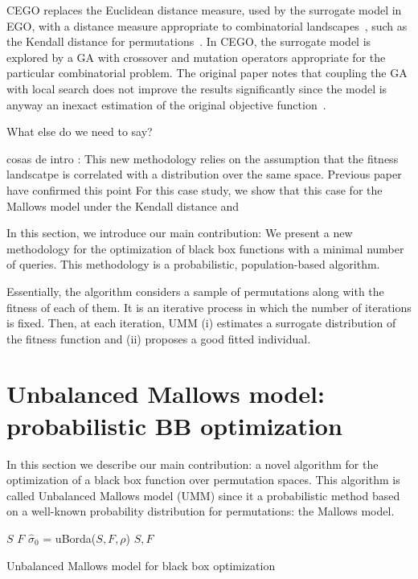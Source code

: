 \documentclass[runningheads]{llncs}
\begin{document}
CEGO replaces the Euclidean distance measure, used by the surrogate model in
EGO, with a distance measure appropriate to combinatorial
landscapes~\citep{ZaeStoBar2014:ppsn}, such as the Kendall distance for
permutations~\citep{?}. In CEGO, the surrogate model is explored by a GA with
crossover and mutation operators appropriate for the particular combinatorial
problem. The original paper notes that coupling the GA with local search does
not improve the results significantly since the model is anyway an inexact
estimation of the original objective
function~\citep[p.~875]{ZaeStoFriFisNauBar2014}.

What else do we need to say?

\newcommand{\minit}{\ensuremath{m_\text{ini}}\xspace}

\newcommand{\FEmax}{\ensuremath{\textit{FE}_{\max}}}

cosas de intro : 
This new methodology relies on the assumption that the fitness landscatpe is correlated with a distribution over the same space. 
Previous paper have confirmed this point
For this case study, we show that this case for the Mallows model under the Kendall distance and 



In this section, we introduce our main contribution: We present a new methodology for the optimization of black box functions with a minimal number of queries. This methodology is a probabilistic, population-based algorithm. 

Essentially, the algorithm  considers a sample of permutations along with the fitness of each of them. It is an iterative process in which the number of iterations is fixed. 
Then, at each iteration, UMM (i) estimates a surrogate distribution of the fitness function and (ii) proposes a good fitted individual. 


\section{Unbalanced Mallows model: probabilistic BB optimization}
In this section we describe our main contribution: a novel algorithm for the optimization of a black box function over permutation spaces. This algorithm is called Unbalanced Mallows model (UMM) since it a probabilistic method based on a well-known probability distribution for permutations: the Mallows model. 

\begin{algorithm}[t]
 $S$\;
 $F$\;
 $\hat\sigma_0$ = uBorda($S, F,\rho$)\;
 \Return $S, F$
 \caption{Unbalanced Mallows model for black box optimization}
 \label{alg:umm}
\end{algorithm}
\end{document}
